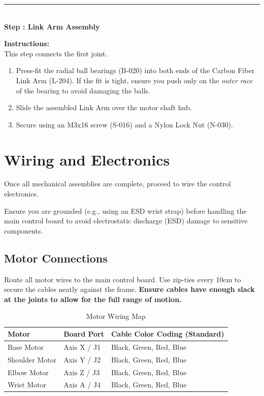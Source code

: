 \documentclass[11pt, a4paper]{article}
\newcounter{stepcounter}
\newenvironment{assemblystep}[1]{
  \refstepcounter{stepcounter}
  \vspace{1.5em}
  {\noindent\color{primary}\rule{\textwidth}{1.5pt}}
  \vspace{0.3em} \\
  {\noindent\Large\textbf{\color{primary}Step \thestepcounter: #1}} \\
  \vspace{-0.5em}
}{
  \vspace{1em}
}
\begin{document}
\begin{assemblystep}{Link Arm Assembly}

\textbf{Instructions:} \\
This step connects the first joint. 
\begin{enumerate}[label=\arabic*., leftmargin=2em]
    \item Press-fit the radial ball bearings (B-020) into both ends of the Carbon Fiber Link Arm (L-204). If the fit is tight, ensure you push only on the \textit{outer race} of the bearing to avoid damaging the balls.
    \item Slide the assembled Link Arm over the motor shaft hub.
    \item Secure using an M3x16 screw (S-016) and a Nylon Lock Nut (N-030).
\end{enumerate}

\end{assemblystep}

\newpage
\section{Wiring and Electronics}

Once all mechanical assemblies are complete, proceed to wire the control electronics.

\begin{notebox}
Ensure you are grounded (e.g., using an ESD wrist strap) before handling the main control board to avoid electrostatic discharge (ESD) damage to sensitive components.
\end{notebox}

\subsection{Motor Connections}
Route all motor wires to the main control board. Use zip-ties every 10cm to secure the cables neatly against the frame. \textbf{Ensure cables have enough slack at the joints to allow for the full range of motion.}

\begin{table}[H]
    \centering
    \renewcommand{\arraystretch}{1.3}
    \begin{tabularx}{0.8\textwidth}{@{}llX@{}}
        \toprule
        \textbf{Motor} & \textbf{Board Port} & \textbf{Cable Color Coding (Standard)} \\
        \midrule
        Base Motor & Axis X / J1 & Black, Green, Red, Blue \\
        Shoulder Motor & Axis Y / J2 & Black, Green, Red, Blue \\
        Elbow Motor & Axis Z / J3 & Black, Green, Red, Blue \\
        Wrist Motor & Axis A / J4 & Black, Green, Red, Blue \\
        \bottomrule
    \end{tabularx}
    \caption{Motor Wiring Map}
\end{table}
\end{document}
